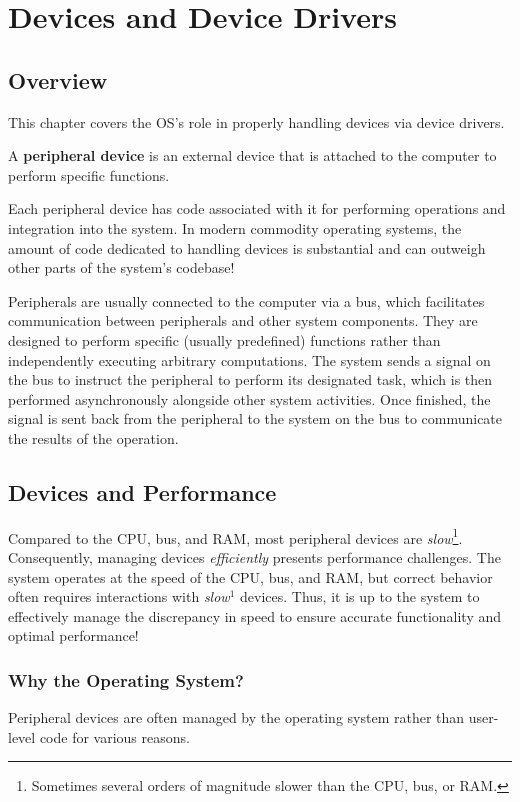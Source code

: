 \documentclass{report}
\newcommand{\definitionBegin}[1]{\begin{tcolorbox}[title={Definition: #1}]}
\newcommand{\definitionEnd}{\end{tcolorbox}}
\begin{document}
\chapter{Devices and Device Drivers}
\section{Overview}
This chapter covers the OS's role in properly handling devices via device drivers.

\definitionBegin{Peripheral Device}
A \textbf{peripheral device} is an external device that is attached to the computer to perform
specific functions.
\definitionEnd

Each peripheral device has code associated with it for performing operations and integration into
the system. In modern commodity operating systems, the amount of code dedicated to handling devices
is substantial and can outweigh other parts of the system's codebase!

Peripherals are usually connected to the computer via a bus, which facilitates communication between
peripherals and other system components. They are designed to perform specific (usually predefined)
functions rather than independently executing arbitrary computations. The system sends a signal on
the bus to instruct the peripheral to perform its designated task, which is then performed asynchronously
alongside other system activities. Once finished, the signal is sent back from the peripheral to the
system on the bus to communicate the results of the operation.

\section{Devices and Performance}
Compared to the CPU, bus, and RAM, most peripheral devices are \textit{slow}\footnote{Sometimes
  several orders of magnitude slower than the CPU, bus, or RAM.}. Consequently, managing devices
\textit{efficiently} presents performance challenges. The system operates at the speed of the CPU,
bus, and RAM, but correct behavior often requires interactions with \textit{slow}$^1$ devices. Thus,
it is up to the system to effectively manage the discrepancy in speed to ensure accurate
functionality and optimal performance!

\subsection{Why the Operating System?}
Peripheral devices are often managed by the operating system rather than user-level code for various
reasons.
\end{document}
